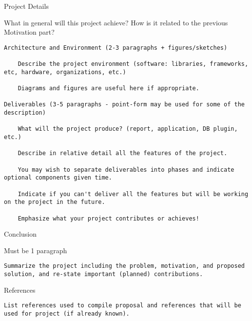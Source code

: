 \documentclass[11pt,]{article}
\begin{document}
Project Details

What in general will this project achieve? How is it related to the
previous Motivation part?

\begin{verbatim}
Architecture and Environment (2-3 paragraphs + figures/sketches)

    Describe the project environment (software: libraries, frameworks, etc, hardware, organizations, etc.)

    Diagrams and figures are useful here if appropriate.

Deliverables (3-5 paragraphs - point-form may be used for some of the description)

    What will the project produce? (report, application, DB plugin, etc.)

    Describe in relative detail all the features of the project.

    You may wish to separate deliverables into phases and indicate optional components given time.

    Indicate if you can't deliver all the features but will be working on the project in the future.

    Emphasize what your project contributes or achieves!
\end{verbatim}

Conclusion

Must be 1 paragraph

\begin{verbatim}
Summarize the project including the problem, motivation, and proposed solution, and re-state important (planned) contributions.
\end{verbatim}

References

\begin{verbatim}
List references used to compile proposal and references that will be used for project (if already known).
\end{verbatim}

\printbibliography
\end{document}
